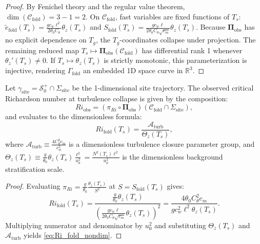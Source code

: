 \begin{proof}
By Fenichel theory and the regular value theorem, $\dim(\mathcal{C}_{\mathrm{fold}}) = 3 - 1 = 2$. On $\mathcal{C}_{\mathrm{fold}}$, fast variables are fixed functions of $T_s$: $\tilde e_{\mathrm{fold}}(T_s) = \frac{g c_w \ell^2}{2\theta_0 C_\theta}\theta_z(T_s)$ and $S_{\mathrm{fold}}(T_s) = \frac{g c_w \ell}{2\theta_0 C_\theta \sqrt{c_m}}\theta_z(T_s)$. Because $\boldsymbol{\Pi}_{\mathrm{obs}}$ has no explicit dependence on $T_g$, the $T_g$-coordinates collapse under projection. The remaining reduced map $T_s \mapsto \boldsymbol{\Pi}_{\mathrm{obs}}(\mathcal{C}_{\mathrm{fold}})$ has differential rank 1 whenever $\theta_z'(T_s) \neq 0$. If $T_s \mapsto \theta_z(T_s)$ is strictly monotonic, this parameterization is injective, rendering $\Gamma_{\mathrm{fold}}$ an embedded 1D space curve in $\mathbb{R}^3$.
\end{proof}

\begin{corollary}
\label{cor:ri_formula}
Let $\gamma_{\mathrm{site}} = \mathcal{S}_0^+ \cap \Sigma_{\mathrm{site}}$ be the 1-dimensional site trajectory. The observed critical Richardson number at turbulence collapse is given by the composition:
\begin{equation}
Ri_{\mathrm{obs}} = \left(\pi_{Ri} \circ \boldsymbol{\Pi}_{\mathrm{obs}}\right)\left(\mathcal{C}_{\mathrm{fold}} \cap \Sigma_{\mathrm{site}}\right),
\label{eq:ri_composition}
\end{equation}
and evaluates to the dimensionless formula:
\begin{equation}
Ri_{\mathrm{fold}}(T_s) = \frac{\mathcal{A}_{\mathrm{turb}}}{\Theta_z(T_s)},
\label{eq:Ri_fold_nondim}
\end{equation}
where $\mathcal{A}_{\mathrm{turb}} \equiv \frac{4 C_\theta^2 c_m}{c_w^2}$ is a dimensionless turbulence closure parameter group, and $\Theta_z(T_s) \equiv \frac{g}{\theta_0} \theta_z(T_s) \frac{\ell^2}{u_0^2} = \frac{N^2(T_s) \ell^2}{u_0^2}$ is the dimensionless background stratification scale.
\end{corollary}

\begin{proof}
Evaluating $\pi_{Ri} = \frac{g}{\theta_0}\frac{\theta_z(T_s)}{S^2}$ at $S = S_{\mathrm{fold}}(T_s)$ gives:
\begin{equation}
Ri_{\mathrm{fold}}(T_s) = \frac{\frac{g}{\theta_0}\theta_z(T_s)}{\left( \frac{g c_w \ell}{2\theta_0 C_\theta \sqrt{c_m}} \theta_z(T_s) \right)^2} = \frac{4 \theta_0 C_\theta^2 c_m}{g c_w^2 \ell^2 \theta_z(T_s)}.
\end{equation}
Multiplying numerator and denominator by $u_0^2$ and substituting $\Theta_z(T_s)$ and $\mathcal{A}_{\mathrm{turb}}$ yields \eqref{eq:Ri_fold_nondim}.
\end{proof}

